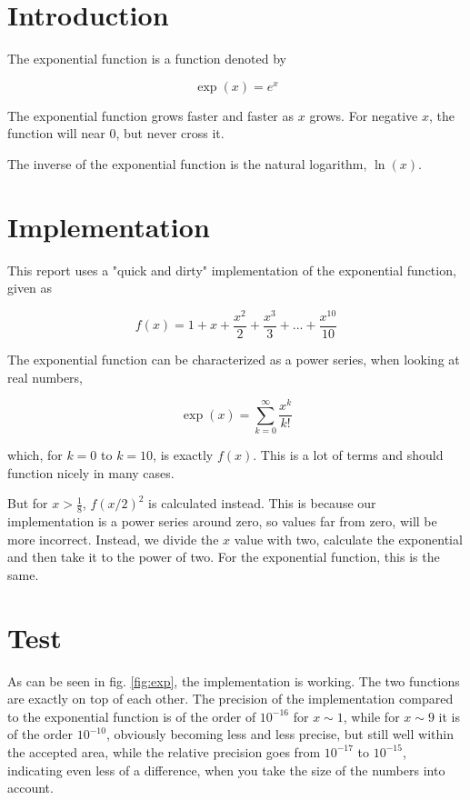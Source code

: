 \documentclass[twocolumn]{article}
\begin{document}
\section{Introduction}

The exponential function is a function denoted by

\begin{equation}
	\exp(x) = e^x
\end{equation}

The exponential function grows faster and faster as $x$ grows. For negative $x$, the function will near 0, but never cross it.

The inverse of the exponential function is the natural logarithm, $\ln(x)$.


\section{Implementation}

This report uses a "quick and dirty" implementation of the exponential function, given as

\begin{equation}
\label{eq:imp}
	f(x) = 1 + x + \frac{x^2}{2} + \frac{x^3}{3} + ... + \frac{x^{10}}{10}
\end{equation}

The exponential function can be characterized as a power series, when looking at real numbers,

\begin{equation}
	\exp(x) = \sum_{k=0}^{\infty} \frac{x^k}{k!}
\end{equation}

which, for $k = 0$ to $k=10$, is exactly $f(x)$. This is a lot of terms and should function nicely in many cases. 

But for $x>\frac{1}{8}$, $ f(x/2)^2$ is calculated instead. This is because our implementation is a power series around zero, so values far from zero, will be more incorrect. Instead, we divide the $x$ value with two, calculate the exponential and then take it to the power of two. For the exponential function, this is the same. 

\section{Test}

As can be seen in fig. \ref{fig:exp}, the implementation is working. The two functions are exactly on top of each other. The precision of the implementation compared to the exponential function is of the order of $10^{-16}$ for $x \sim 1$, while for $x\sim 9$ it is of the order $10^{-10}$, obviously becoming less and less precise, but still well within the accepted area, while the relative precision goes from $10^{-17}$ to $10^{-15}$, indicating even less of a difference, when you take the size of the numbers into account.
\end{document}
